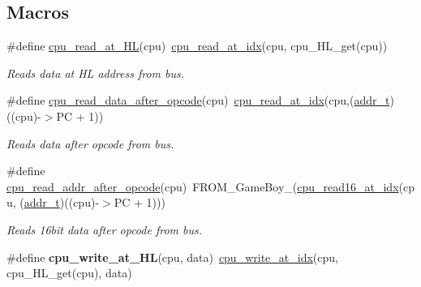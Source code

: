 \subsection*{Macros}
\begin{DoxyCompactItemize}
\item 
\mbox{\label{cpu-storage_8h_accb2e5189860ff3f46efdca63fe4f3c6}} 
\#define \hyperlink{cpu-storage_8h_accb2e5189860ff3f46efdca63fe4f3c6}{cpu\+\_\+read\+\_\+at\+\_\+\+HL}(cpu)~\hyperlink{cpu-storage_8h_a344ca7bbdfd21880efbf1fa20c5750b9}{cpu\+\_\+read\+\_\+at\+\_\+idx}(cpu, cpu\+\_\+\+H\+L\+\_\+get(cpu))
\begin{DoxyCompactList}\small\item\em Reads data at HL address from bus. \end{DoxyCompactList}\item 
\mbox{\label{cpu-storage_8h_acbe1f9d259d3fc25ede7ed09c973992b}} 
\#define \hyperlink{cpu-storage_8h_acbe1f9d259d3fc25ede7ed09c973992b}{cpu\+\_\+read\+\_\+data\+\_\+after\+\_\+opcode}(cpu)~\hyperlink{cpu-storage_8h_a344ca7bbdfd21880efbf1fa20c5750b9}{cpu\+\_\+read\+\_\+at\+\_\+idx}(cpu,(\hyperlink{memory_8h_a8a6444037e4d5cc2bf8ba22a9d9e33ca}{addr\+\_\+t})((cpu)-\/$>$PC + 1))
\begin{DoxyCompactList}\small\item\em Reads data after opcode from bus. \end{DoxyCompactList}\item 
\mbox{\label{cpu-storage_8h_ad3b9553f37930361c6d34332bbb88e78}} 
\#define \hyperlink{cpu-storage_8h_ad3b9553f37930361c6d34332bbb88e78}{cpu\+\_\+read\+\_\+addr\+\_\+after\+\_\+opcode}(cpu)~F\+R\+O\+M\+\_\+\+Game\+Boy\+\_(\hyperlink{cpu-storage_8h_aa4dd23db2c717ae059d9daff6051501b}{cpu\+\_\+read16\+\_\+at\+\_\+idx}(cpu, (\hyperlink{memory_8h_a8a6444037e4d5cc2bf8ba22a9d9e33ca}{addr\+\_\+t})((cpu)-\/$>$PC + 1)))
\begin{DoxyCompactList}\small\item\em Reads 16bit data after opcode from bus. \end{DoxyCompactList}\item 
\mbox{\label{cpu-storage_8h_a2358227ced3cd18bb494c3bb68999f65}} 
\#define {\bfseries cpu\+\_\+write\+\_\+at\+\_\+\+HL}(cpu,  data)~\hyperlink{cpu-storage_8h_ae76e9c113ecf820b05d8b5f5db09b229}{cpu\+\_\+write\+\_\+at\+\_\+idx}(cpu, cpu\+\_\+\+H\+L\+\_\+get(cpu), data)
\end{DoxyCompactItemize}
